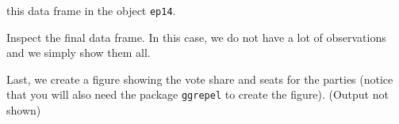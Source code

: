 \documentclass[12pt,oneside]{reedthesis}
\theoremstyle{definition}
\theoremstyle{definition}
\theoremstyle{definition}
\theoremstyle{remark}
\begin{document}
  this data frame in the object \texttt{ep14}.
  \begin{Shaded}
  \end{Shaded}
  Inspect the final data frame. In this case, we do not have a lot of
  observations and we simply show them all.
  \begin{Shaded}
  \begin{Highlighting}[]
  \end{Highlighting}
  \end{Shaded}
  Last, we create a figure showing the vote share and seats for the
  parties (notice that you will also need the package \texttt{ggrepel} to
  create the figure). (Output not shown)
  \begin{Shaded}
  \begin{Highlighting}[]
  \NormalTok{(}\OperatorTok{+}
  \StringTok{  }\NormalTok{() }\OperatorTok{+}
  \StringTok{  }\NormalTok{() }\OperatorTok{+}
  \StringTok{  }\OperatorTok{::}\NormalTok{(}
      \NormalTok{(} \OperatorTok{>}\StringTok{ }\NormalTok{)),}
         \NormalTok{,}
        \NormalTok{,}
  \NormalTok{    ) }\OperatorTok{+}
  \StringTok{  }\NormalTok{(}
       \NormalTok{,}
       \NormalTok{,}
       
  \NormalTok{  )}
  \end{Highlighting}
  \end{Shaded}
\end{document}
